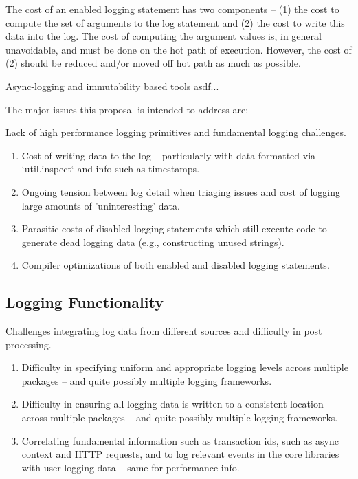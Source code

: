 \begin{design}
The cost of an enabled logging statement has two components -- (1) the cost to compute the set of 
arguments to the log statement and (2) the cost to write this data into the log. The cost of computing 
the argument values is, in general unavoidable, and must be done on the hot path of execution. However, 
the cost of (2) should be reduced and/or moved off hot path as much as possible.
\end{design}
Async-logging and immutability based tools asdf...





The major issues this proposal is intended to address are:

\noindent
Lack of high performance logging primitives and fundamental logging challenges.
\begin{enumerate}
 \item Cost of writing data to the log -- particularly with data formatted via 
    `util.inspect` and info such as timestamps.
 \item Ongoing tension between log detail when triaging issues and cost of logging 
    large amounts of 'uninteresting' data.
\item Parasitic costs of disabled logging statements which still execute code to 
    generate dead logging data (e.g., constructing unused strings).
\item Compiler optimizations of both enabled and disabled logging statements.
\end{enumerate}

\subsection{Logging Functionality}
\label{subsec:functionalitydesign}

\noindent
Challenges integrating log data from different sources and difficulty in post processing.
\begin{enumerate}
\item Difficulty in specifying uniform and appropriate logging levels across 
    multiple packages -- and quite possibly multiple logging frameworks.
\item Difficulty in ensuring all logging data is written to a consistent location 
    across multiple packages -- and quite possibly multiple logging frameworks.
\item Correlating fundamental information such as  
    transaction ids, such as async context and HTTP requests, and to log relevant 
    events in the core libraries with user logging data -- same for performance info.
\end{enumerate}

